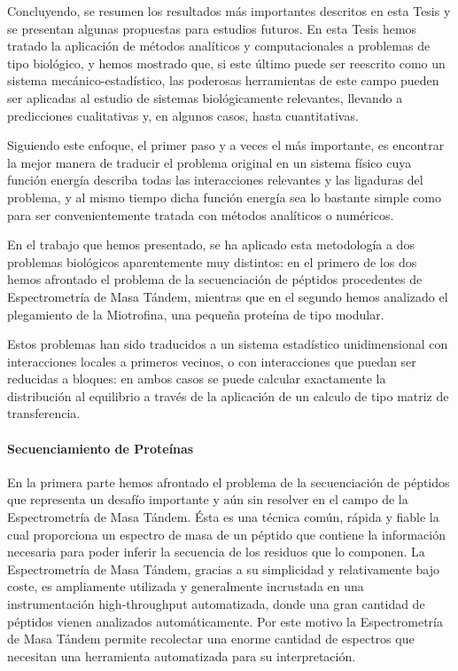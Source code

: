 
Concluyendo, se resumen los resultados más importantes descritos en esta
Tesis y se presentan algunas propuestas para estudios futuros.
En esta Tesis hemos tratado la aplicación de métodos analíticos y computacionales a
problemas de tipo biológico, y hemos mostrado que, si este último puede ser reescrito
como un
sistema mecánico-estadístico, las poderosas herramientas de este campo pueden
ser aplicadas al estudio de sistemas biológicamente relevantes, llevando a
predicciones cualitativas y, en algunos casos, hasta cuantitativas. 

Siguiendo este enfoque, el primer paso y a veces el más importante, es encontrar la mejor
manera de traducir el problema original en un sistema físico cuya función energía
describa todas las interacciones relevantes y las ligaduras del problema,
y al mismo tiempo dicha función energía sea lo bastante simple como para ser convenientemente
tratada con métodos analíticos o numéricos.

En el trabajo que hemos presentado, se ha aplicado esta metodología 
a dos problemas biológicos aparentemente muy distintos: 
en el primero de los dos hemos afrontado el problema de la
secuenciación de péptidos procedentes de Espectrometría  de Masa Tándem,
mientras que en el segundo hemos analizado el plegamiento de la Miotrofina, una
pequeña proteína de tipo modular.

Estos problemas han sido traducidos a un sistema estadístico unidimensional con
interacciones locales a primeros vecinos, o con interacciones que puedan
ser reducidas a bloques: en ambos casos se puede calcular
exactamente la distribución al equilibrio a través de la aplicación de un
calculo de tipo matriz de transferencia. 

\paragraph{Secuenciamiento de Proteínas}
En la primera parte hemos afrontado el problema de la secuenciación de
péptidos que representa un desafío importante y aún sin resolver en el campo
de la Espectrometría de Masa Tándem.
\'Esta es una técnica común, rápida y fiable la cual proporciona un espectro de masa
de un péptido que contiene la información necesaria para poder inferir la
secuencia de los residuos que lo componen.
La Espectrometría de Masa Tándem, gracias a su simplicidad y relativamente bajo
coste, es ampliamente utilizada y generalmente incrustada en una instrumentación
high-throughput automatizada, donde una gran cantidad de péptidos
vienen analizados automáticamente.
Por este motivo la Espectrometría de Masa Tándem permite recolectar una enorme cantidad de espectros que 
necesitan una herramienta automatizada para su interpretación.

